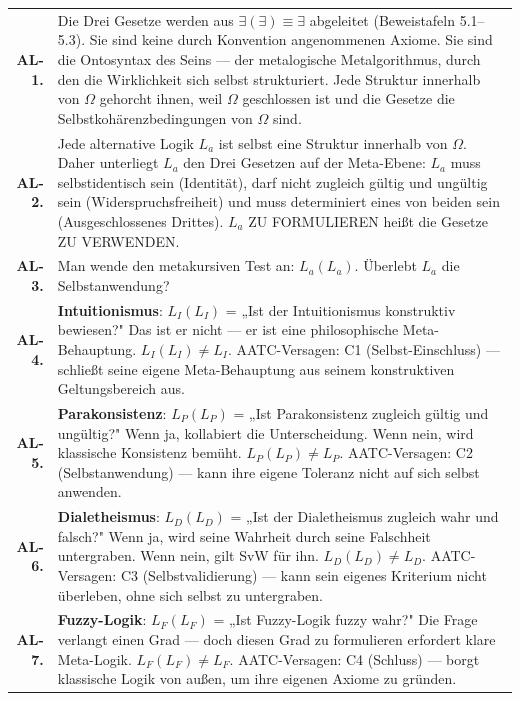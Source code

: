 \documentclass[10pt, openany, oneside]{book}
\renewcommand{\footnotesize}{\fontsize{8.5}{11}\selectfont}
\begin{document}
{\footnotesize
\noindent\begin{tabular}{r p{}}
\textbf{AL-1.} & Die Drei Gesetze werden aus $\exists(\exists) \equiv \exists$ abgeleitet (Beweistafeln 5.1--5.3). Sie sind keine durch Konvention angenommenen Axiome. Sie sind die Ontosyntax des Seins --- der metalogische Metalgorithmus, durch den die Wirklichkeit sich selbst strukturiert. Jede Struktur innerhalb von $\Omega$ gehorcht ihnen, weil $\Omega$ geschlossen ist und die Gesetze die Selbstkohärenzbedingungen von $\Omega$ sind. \\[0.3em]
\textbf{AL-2.} & Jede alternative Logik $L_a$ ist selbst eine Struktur innerhalb von $\Omega$. Daher unterliegt $L_a$ den Drei Gesetzen auf der Meta-Ebene: $L_a$ muss selbstidentisch sein (Identität), darf nicht zugleich gültig und ungültig sein (Widerspruchsfreiheit) und muss determiniert eines von beiden sein (Ausgeschlossenes Drittes). $L_a$ ZU FORMULIEREN heißt die Gesetze ZU VERWENDEN. \\[0.3em]
\textbf{AL-3.} & Man wende den metakursiven Test an: $L_a(L_a)$. Überlebt $L_a$ die Selbstanwendung? \\[0.3em]
\textbf{AL-4.} & \textbf{Intuitionismus}: $L_I(L_I)$ = „Ist der Intuitionismus konstruktiv bewiesen?" Das ist er nicht --- er ist eine philosophische Meta-Behauptung. $L_I(L_I) \neq L_I$. AATC-Versagen: C1 (Selbst-Einschluss) --- schließt seine eigene Meta-Behauptung aus seinem konstruktiven Geltungsbereich aus. \\[0.3em]
\textbf{AL-5.} & \textbf{Parakonsistenz}: $L_P(L_P)$ = „Ist Parakonsistenz zugleich gültig und ungültig?" Wenn ja, kollabiert die Unterscheidung. Wenn nein, wird klassische Konsistenz bemüht. $L_P(L_P) \neq L_P$. AATC-Versagen: C2 (Selbstanwendung) --- kann ihre eigene Toleranz nicht auf sich selbst anwenden. \\[0.3em]
\textbf{AL-6.} & \textbf{Dialetheismus}: $L_D(L_D)$ = „Ist der Dialetheismus zugleich wahr und falsch?" Wenn ja, wird seine Wahrheit durch seine Falschheit untergraben. Wenn nein, gilt SvW für ihn. $L_D(L_D) \neq L_D$. AATC-Versagen: C3 (Selbstvalidierung) --- kann sein eigenes Kriterium nicht überleben, ohne sich selbst zu untergraben. \\[0.3em]
\textbf{AL-7.} & \textbf{Fuzzy-Logik}: $L_F(L_F)$ = „Ist Fuzzy-Logik fuzzy wahr?" Die Frage verlangt einen Grad --- doch diesen Grad zu formulieren erfordert klare Meta-Logik. $L_F(L_F) \neq L_F$. AATC-Versagen: C4 (Schluss) --- borgt klassische Logik von außen, um ihre eigenen Axiome zu gründen. \\[0.3em]

\end{tabular}}
\end{document}
